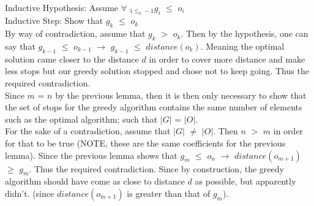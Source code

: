 \documentclass{article}
\begin{document}
Inductive Hypothesis: Assume $\forall$ $_{1 \leq _k-1}g_i$ $\leq$ $o_i$\\

Inductive Step: Show that $g_k$ $\leq$ $o_k$\\
By way of contradiction, assume that $g_k$ $>$ $o_k$. Then by the hypothesis, one can say that $g_{k-1}$ $\leq$ $o_{k-1}$ $\rightarrow$ $g_{k-1}$ $\leq$ $distance(o_{k})$. Meaning the optimal solution came closer to the distance $d$ in order to cover more distance and make less stops but our greedy solution stopped and chose not to keep going. Thus the required contradiction. \\

Since $m$ = $n$ by the previous lemma, then it is then only necessary to show that the set of stops for the greedy algorithm contains the same number of elements such as the optimal algorithm; such that $|G|$ = $|O|$.\\

For the sake of a contradiction, assume that $|G|$ $\neq$ $|O|$. Then $n$ $>$ $m$ in order for that to be true (NOTE, these are the same coefficients for the previous lemma). Since the previous lemma shows that $g_m$ $\leq$ $o_n$ $\rightarrow$ $distance(o_{m+1})$ $\geq$ $g_m$. Thus the required contradiction. Since by construction, the greedy algorithm should have come as close to distance $d$ as possible, but apparently didn't. (since $distance(o_{m+1})$ is greater than that of $g_m$).
\end{document}
